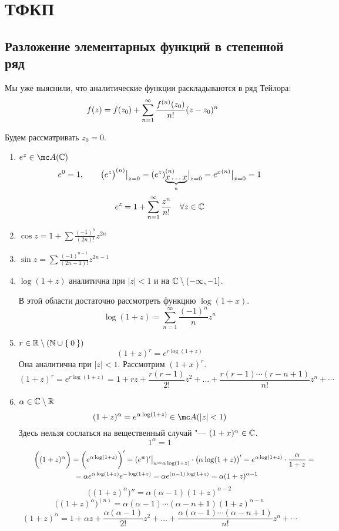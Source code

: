 \chapter{ТФКП}

\section{Разложение элементарных функций в степенной ряд}

Мы уже выяснили, что аналитические функции раскладываются в ряд Тейлора:
$$ f(z) = f(z_0) + \sum_{n = 1}^\infty \frac{{f}^{({n})}(z_0)}{n!}(z - z_0)^n $$

Будем рассматривать $ z_0 = 0 $.
\begin{enumerate}
	\item $ e^z \in \mc A(\Co) $
	$$ e^0 = 1, \qquad {\big(e^z \big)}^{({n})}\big|_{z = 0}^{} = {(e^z)}^{({n})}_{\underbrace{x\dots x}_n}\big|_{z = 0}^{} = {e^x}^{({n})}\big|_{x = 0}^{} = 1 $$
	$$ e^z = 1 + \sum_{n = 1}^\infty \frac{z^n}{n!} \quad \forall z \in \mathbb{C} $$
	\item $ \cos z = 1 + \sum \frac{(-1)^n}{(2n)!} z^{2n} $
	\item $ \sin z = \sum \frac{(-1)^{n - 1}}{(2n - 1)!} z^{2n - 1} $
	\item $ \log (1 + z) $ аналитична при $ |z| < 1 $ и на $ \mathbb{C} \setminus (-\infty, -1] $.

	В этой области достаточно рассмотреть функцию $ \log (1 + x) $.
	$$ \log(1 + z) = \sum_{n = 1}^\infty \frac{(-1)^n}{n}z^n $$
	\item $ r \in \mathbb{R} \setminus (\mathbb{N} \cup \Set 0) $
	$$ (1 + z)^r = e^{r \log(1 + z)} $$
	Она аналитична при $ |z| < 1 $. Рассмотрим $ (1 + x)^r $.
	$$ (1 + z)^r = e^{r \log(1 + z)} = 1 + rz + \frac{r(r - 1)}{2!}z^2 + \dots + \frac{r(r - 1) \cdots (r - n + 1)}{n!} z^n + \cdots $$
	\item $ \alpha \in \mathbb{C} \setminus \mathbb{R} $
	$$ (1 + z)^\alpha = e^{\alpha \log(1 + z)} \in \mc A(|z| < 1) $$
	Здесь нельзя сослаться на вещественный случай "--- $ (1 + x)^\alpha \in \mathbb{C} $.
	$$ 1^\alpha = 1 $$
	\begin{multline*}
		\qquad \bigg( (1 + z)^\alpha \bigg) = \bigg( e^{\alpha \log(1 + z)} \bigg)' = (e^w)'\big|_{w = \alpha \log(1 + z)}^{} \cdot \big( \alpha \log(1 + z) \big)' = e^{\alpha \log(1 + z)} \cdot \frac\alpha{1 + z} = \\
		= \alpha e^{\alpha \log(1 + z)} e^{-\log(1 + z)} = \alpha e^{(\alpha - 1) \log(1 + z)} = \alpha(1 + z)^{\alpha - 1}
	\end{multline*}
	$$ \bigg( (1 + z)^\alpha \bigg)'' = \alpha(\alpha - 1)(1 + z)^{\alpha - 2} $$
	$$ \bigg( (1 + z)^\alpha \bigg)^{(n)} = \alpha(\alpha - 1) \cdots (\alpha - n + 1)(1 + z)^{\alpha - n} $$
	$$ (1 + z)^\alpha = 1 + \alpha z + \frac{\alpha(\alpha - 1)}{2!} z^2 + \dots + \frac{\alpha(\alpha - 1) \cdots (\alpha - n + 1)}{n!} z^n + \cdots $$
\end{enumerate}

